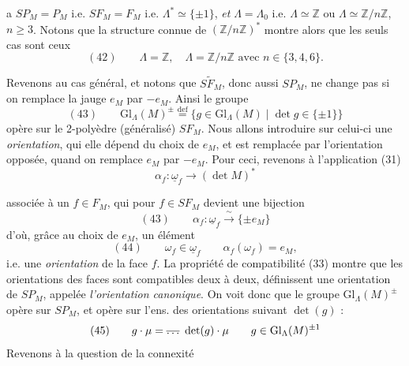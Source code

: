 \documentclass[11pt,a4paper]{article}
\begin{document}
a $SP_M = P_M$ i.e. $SF_M = F_M$ i.e. $\Lambda^* \simeq \{\pm 1\}$, \emph{et} $\Lambda = \Lambda_0$ i.e. $\Lambda \simeq \mathbb{Z}$ ou $\Lambda \simeq \mathbb{Z}/n\mathbb{Z}$, $n \geq 3$. Notons que la structure connue de $(\mathbb{Z}/n\mathbb{Z})^*$ montre alors que les seuls cas sont ceux \struck{\ill{}}
\[
(42)\qquad \Lambda = \mathbb{Z}, \quad \Lambda = \mathbb{Z}/n\mathbb{Z} \text{ avec } n \in \{3,4,6\} .
\]

Revenons au cas général,  et notons que $S\widetilde{F}_M$, donc aussi $SP_M$, ne  change pas si on remplace la jauge $e_M$ par $-e_M$. Ainsi le groupe
\[
(43)\qquad \mathrm{Gl}_\Lambda(M)^{\pm} \overset{\mathrm{def}}{=} \{ g \in \mathrm{Gl}_\Lambda(M) \mid \det g \in \{\pm 1\} \}
\]
opère sur le 2-polyèdre (généralisé) $SF_M$. Nous allons introduire sur celui-ci une \emph{orientation}, qui elle dépend du choix de $e_M$, et est remplacée par l'orientation opposée, quand on remplace $e_M$ par $-e_M$. Pour ceci, revenons à l'application (31)
\[
\alpha_f : \underline{\omega}_f \longrightarrow (\det M)^*
\]

associée à un $f \in F_M$, qui pour $f \in SF_M$ devient une bijection
\[
(43)\qquad \alpha_f : \underline{\omega}_f \xrightarrow{\ \sim\ } \{\pm e_M\}
\]
d'où, grâce au choix de $e_M$, un élément
\[
(44)\qquad \omega_f \in \underline{\omega}_f \qquad \alpha_f(\omega_f) = e_M ,
\]
\struck{\ill{}} i.e. une \emph{orientation}  de la face $f$. La propriété de compatibilité (33) montre que les orientations des faces  sont compatibles deux à deux,  définissent une orientation \add{$\mu$} de $SP_M$, appelée \emph{l'orientation canonique}. On voit donc que le groupe $\mathrm{Gl}_\Lambda(M)^{\pm}$ opère sur $SP_M$, et opère sur l'ens. des orientations   suivant $\det(g)$ :
\[
(45)\qquad g \cdot \mu = \text{\struck{$\ldots$}}\ \det(g) \cdot \mu \qquad g \in \mathrm{Gl}_\Lambda(M)^{\pm 1}
\]
Revenons  à la question de la connexité
\end{document}
